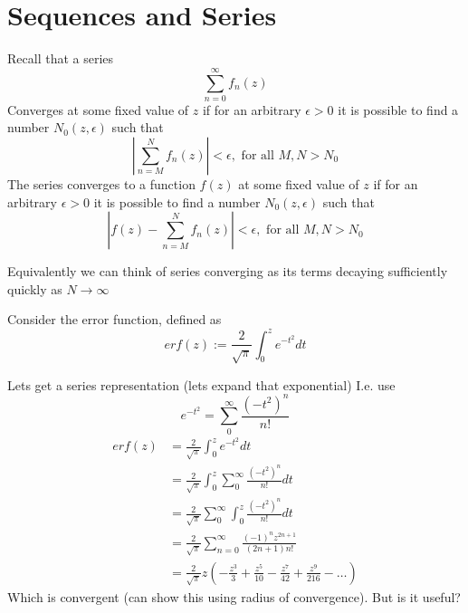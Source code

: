\documentclass{/home/janmebows/Documents/LatexTemplates/myassignment}
\begin{document}
\section{Sequences and Series}
Recall that a series
\[\sum_{n=0}^\infty f_n(z)\]
Converges at some fixed value of $z$ if for an arbitrary $\epsilon >0$ it is possible to find a number $N_0(z,\epsilon)$ such that
\[\left|\sum_{n=M}^N f_n(z)\right| < \epsilon, \text{ for all }M,N>N_0\]
The series converges to a function $f(z)$ at some fixed value of $z$ if for an arbitrary $\epsilon >0$ it is possible to find a number $N_0(z,\epsilon)$ such that
\[\left|f(z) - \sum_{n=M}^N f_n(z)\right| < \epsilon, \text{ for all }M,N>N_0\]

Equivalently we can think of series converging as its terms decaying sufficiently quickly as $N\to \infty$


Consider the error function, defined as
\[erf(z) := \frac2{\sqrt{\pi}} \int_0^z e^{-t^2}dt\]

Lets get a series representation (lets expand that exponential)
I.e. use
\[e^{-t^2} = \sum_{0}^\infty \frac{(-t^2)^n}{n!}\]
\begin{align*}
    erf(z) &= \frac{2}{\sqrt{\pi}} \int_0^z e^{-t^2}dt\\
    &=\frac{2}{\sqrt{\pi}} \int_0^z \sum_{0}^\infty \frac{(-t^2)^n}{n!} dt\\
    &=\frac{2}{\sqrt{\pi}}  \sum_{0}^\infty \int_0^z\frac{(-t^2)^n}{n!} dt\\
    &= \frac2{\sqrt{\pi}} \sum_{n=0}^\infty \frac{(-1)^n z^{2n+1}}{(2n+1)n!}\\
    &= \frac2{\sqrt{\pi}}z( - \frac{z^3}{3} + \frac{z^5}{10} - \frac{z^7}{42} + \frac{z^9}{216} - \hdots )
\end{align*}
Which is convergent (can show this using radius of convergence). But is it useful?
\end{document}
